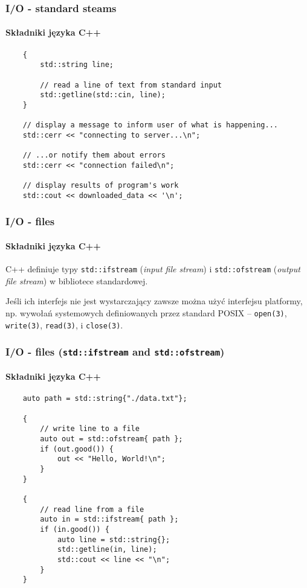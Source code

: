 \documentclass[aspectratio=169]{beamer}
\begin{document}
\begin{frame}[fragile]
    \frametitle{I/O - standard steams}
    \framesubtitle{Składniki języka C++}

    {\scriptsize
    \begin{lstlisting}
    {
        std::string line;

        // read a line of text from standard input
        std::getline(std::cin, line);
    }

    // display a message to inform user of what is happening...
    std::cerr << "connecting to server...\n";

    // ...or notify them about errors
    std::cerr << "connection failed\n";

    // display results of program's work
    std::cout << downloaded_data << '\n';
    \end{lstlisting}}
\end{frame}

\begin{frame}
    \frametitle{I/O - files}
    \framesubtitle{Składniki języka C++}

    C++ definiuje typy {\tt std::ifstream} (\emph{input file stream}) i
    {\tt std::ofstream} (\emph{output file stream}) w bibliotece standardowej.

    \vspace{1em}

    Jeśli ich interfejs nie jest wystarczający zawsze można użyć interfejsu
    platformy, np. wywołań systemowych definiowanych przez standard POSIX --
    {\tt open(3)}, {\tt write(3)}, {\tt read(3)}, i {\tt close(3)}.
\end{frame}

\begin{frame}[fragile]
    \frametitle{I/O - files ({\tt std::ifstream} and {\tt std::ofstream})}
    \framesubtitle{Składniki języka C++}

    {\scriptsize
    \begin{lstlisting}
    auto path = std::string{"./data.txt"};

    {
        // write line to a file
        auto out = std::ofstream{ path };
        if (out.good()) {
            out << "Hello, World!\n";
        }
    }

    {
        // read line from a file
        auto in = std::ifstream{ path };
        if (in.good()) {
            auto line = std::string{};
            std::getline(in, line);
            std::cout << line << "\n";
        }
    }
    \end{lstlisting}}
\end{frame}
\end{document}
